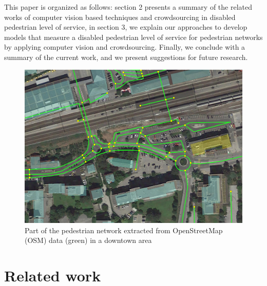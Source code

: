 \documentclass[10pt,conference,a4paper]{IEEEtran}
\begin{document}
This paper is organized as follows: section 2 presents a summary of the related works of computer vision based techniques and crowdsourcing in disabled pedestrian level of service, in section 3, we explain our approaches to develop models that measure a disabled pedestrian level of service for pedestrian networks by applying computer vision and crowdsourcing. Finally, we conclude with a summary of the current work, and we present suggestions for future research.


\begin{figure}[t]
\begin{center}
\includegraphics[width=1.0\linewidth]{OSM_walk_graph_02.jpg}
\end{center}
   \caption{Part of the pedestrian network extracted from OpenStreetMap (OSM) data (green) in a downtown area }\label{pedestriangraph}
\end{figure}

\section{Related work}


\end{document}
